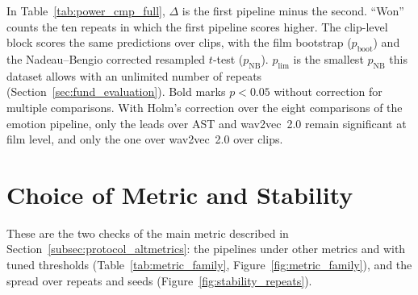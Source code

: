 In Table~\ref{tab:power_cmp_full}, $\Delta$ is the first pipeline minus the second.
``Won'' counts the ten repeats in which the first pipeline scores higher. The clip-level
block scores the same predictions over clips, with the film bootstrap ($p_{\text{boot}}$)
and the Nadeau--Bengio corrected resampled $t$-test ($p_{\text{NB}}$). $p_{\lim}$ is the
smallest $p_{\text{NB}}$ this dataset allows with an unlimited number of repeats
(Section~\ref{sec:fund_evaluation}). Bold marks $p<0.05$ without correction for multiple
comparisons. With Holm's correction over the eight comparisons of the emotion pipeline, only the
leads over AST and wav2vec~2.0 remain significant at film level, and only the one over
wav2vec~2.0 over clips.

\section{Choice of Metric and Stability}
\label{sec:eval_robustness}

These are the two checks of the main metric described in Section~\ref{subsec:protocol_altmetrics}:
the pipelines under other metrics and with tuned thresholds (Table~\ref{tab:metric_family},
Figure~\ref{fig:metric_family}), and the spread over repeats and seeds
(Figure~\ref{fig:stability_repeats}).

